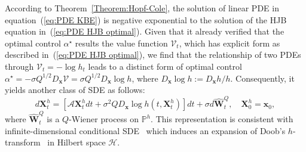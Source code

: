 \documentclass[nohyperref]{article}
\theoremstyle{plain}
\theoremstyle{remark}
\newcommand{\mc}{\mathcal}
\newcommand{\mb}{\mathbf}
\begin{document}
According to Theorem~\ref{Theorem:Hopf-Cole}, the solution of linear PDE in equation~(\ref{eq:PDE KBE}) is negative exponential to the solution of the HJB equation in~(\ref{eq:PDE HJB optimal}). Given that it already verified that the optimal control $\alpha^{\star}$ results the value function $\mc{V}_t$, which has explicit form as described in~(\ref{eq:PDE HJB optimal}), we find that the relationship of two PDEs through $\mc{V}_t = -\log h_t$ leads to a distinct form of optimal control $\alpha^{\star} = -\sigma Q^{1/2} D_{\mb{x}} \mathcal{V} = \sigma Q^{1/2} D_{\mb{x}} \log h$, where $D_{\mb{x}} \log h := D_{\mb{x}}h/h$. 
Consequently, it yields another class of SDE as follows:
\begin{equation}\label{eq:conditioned SDE}
    d\mb{X}^h_t = \left[\mc{A}\mb{X}^h_tdt + \sigma^2 Q D_{\mb{x}} \log h(t, \mb{X}_t^h) \right]dt + \sigma d\mb{\hat{W}}_t^{Q}, \quad \mb{X}^h_0 = \mb{x}_0,
\end{equation}
where $\mb{\hat{W}}^Q_t$ is a $Q$-Wiener process on $\mathbb{P}^h$. This representation is consistent with infinite-dimensional conditional SDE~\citep{fuhrman2003class, baker2024conditioning} which induces an expansion of Doob's $h$-transform~\citep{rogers2000diffusions} in Hilbert space $\mc{H}$. 
\end{document}
